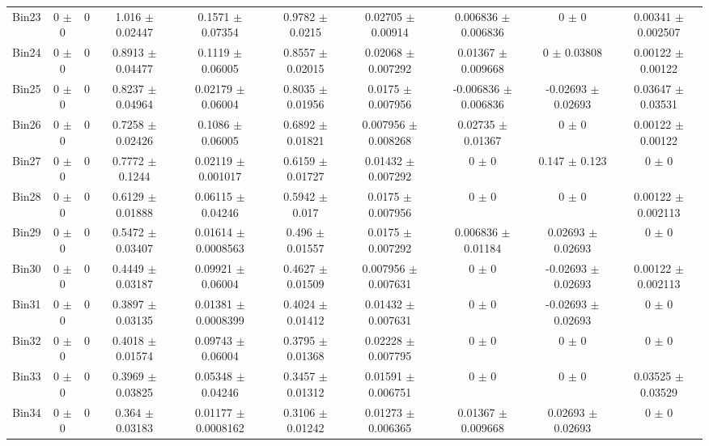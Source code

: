 \begin{tabular}{@{\extracolsep{4pt}}lccccccccc@{}}
     Bin23 & 0 $\pm$ 0 & 0 & 1.016 $\pm$ 0.02447 & 0.1571 $\pm$ 0.07354 & 0.9782 $\pm$ 0.0215 & 0.02705 $\pm$ 0.00914 & 0.006836 $\pm$ 0.006836 & 0 $\pm$ 0 & 0.00341 $\pm$ 0.002507 \\ 
     Bin24 & 0 $\pm$ 0 & 0 & 0.8913 $\pm$ 0.04477 & 0.1119 $\pm$ 0.06005 & 0.8557 $\pm$ 0.02015 & 0.02068 $\pm$ 0.007292 & 0.01367 $\pm$ 0.009668 & 0 $\pm$ 0.03808 & 0.00122 $\pm$ 0.00122 \\ 
     Bin25 & 0 $\pm$ 0 & 0 & 0.8237 $\pm$ 0.04964 & 0.02179 $\pm$ 0.06004 & 0.8035 $\pm$ 0.01956 & 0.0175 $\pm$ 0.007956 & -0.006836 $\pm$ 0.006836 & -0.02693 $\pm$ 0.02693 & 0.03647 $\pm$ 0.03531 \\ 
     Bin26 & 0 $\pm$ 0 & 0 & 0.7258 $\pm$ 0.02426 & 0.1086 $\pm$ 0.06005 & 0.6892 $\pm$ 0.01821 & 0.007956 $\pm$ 0.008268 & 0.02735 $\pm$ 0.01367 & 0 $\pm$ 0 & 0.00122 $\pm$ 0.00122 \\ 
     Bin27 & 0 $\pm$ 0 & 0 & 0.7772 $\pm$ 0.1244 & 0.02119 $\pm$ 0.001017 & 0.6159 $\pm$ 0.01727 & 0.01432 $\pm$ 0.007292 & 0 $\pm$ 0 & 0.147 $\pm$ 0.123 & 0 $\pm$ 0 \\ 
     Bin28 & 0 $\pm$ 0 & 0 & 0.6129 $\pm$ 0.01888 & 0.06115 $\pm$ 0.04246 & 0.5942 $\pm$ 0.017 & 0.0175 $\pm$ 0.007956 & 0 $\pm$ 0 & 0 $\pm$ 0 & 0.00122 $\pm$ 0.002113 \\ 
     Bin29 & 0 $\pm$ 0 & 0 & 0.5472 $\pm$ 0.03407 & 0.01614 $\pm$ 0.0008563 & 0.496 $\pm$ 0.01557 & 0.0175 $\pm$ 0.007292 & 0.006836 $\pm$ 0.01184 & 0.02693 $\pm$ 0.02693 & 0 $\pm$ 0 \\ 
     Bin30 & 0 $\pm$ 0 & 0 & 0.4449 $\pm$ 0.03187 & 0.09921 $\pm$ 0.06004 & 0.4627 $\pm$ 0.01509 & 0.007956 $\pm$ 0.007631 & 0 $\pm$ 0 & -0.02693 $\pm$ 0.02693 & 0.00122 $\pm$ 0.002113 \\ 
     Bin31 & 0 $\pm$ 0 & 0 & 0.3897 $\pm$ 0.03135 & 0.01381 $\pm$ 0.0008399 & 0.4024 $\pm$ 0.01412 & 0.01432 $\pm$ 0.007631 & 0 $\pm$ 0 & -0.02693 $\pm$ 0.02693 & 0 $\pm$ 0 \\ 
     Bin32 & 0 $\pm$ 0 & 0 & 0.4018 $\pm$ 0.01574 & 0.09743 $\pm$ 0.06004 & 0.3795 $\pm$ 0.01368 & 0.02228 $\pm$ 0.007795 & 0 $\pm$ 0 & 0 $\pm$ 0 & 0 $\pm$ 0 \\ 
     Bin33 & 0 $\pm$ 0 & 0 & 0.3969 $\pm$ 0.03825 & 0.05348 $\pm$ 0.04246 & 0.3457 $\pm$ 0.01312 & 0.01591 $\pm$ 0.006751 & 0 $\pm$ 0 & 0 $\pm$ 0 & 0.03525 $\pm$ 0.03529 \\ 
     Bin34 & 0 $\pm$ 0 & 0 & 0.364 $\pm$ 0.03183 & 0.01177 $\pm$ 0.0008162 & 0.3106 $\pm$ 0.01242 & 0.01273 $\pm$ 0.006365 & 0.01367 $\pm$ 0.009668 & 0.02693 $\pm$ 0.02693 & 0 $\pm$ 0 \\ 

\end{tabular}
